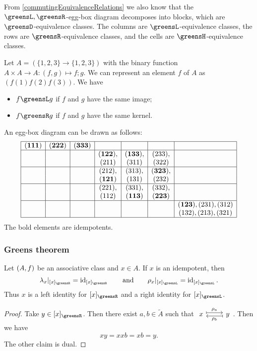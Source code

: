 From \ref{commutingEquivalenceRelations} we also know that the $\greensL,\greensR$-egg-box diagram decomposes into blocks, which are $\greensD$-equivalence classes. The columns are $\greensL$-equivalence classes, the rows are $\greensR$-equivalence classes, and the cells are $\greensH$-equivalence classes.

\begin{example}
Let $A = (\{1,2,3\} \to \{1,2,3\})$ with the binary function $A\times A \to A: (f,g)\mapsto f;g$. We can represent an element $f$ of $A$ as $(f(1) f(2) f(3))$. We have
\begin{itemize}
\item $f\greensL g$ if $f$ and $g$ have the same image;
\item $f\greensR g$ if $f$ and $g$ have the same kernel.
\end{itemize}
An egg-box diagram can be drawn as follows:
\[ \begin{array}{|c|c|c|c|c|c|c|}
\hline
\mathbf{(1 1 1)} & \mathbf{(2 2 2)} & \mathbf{(3 3 3)} &&& &  \\ \hline
&& & \mathbf{(1 2 2)}, & \mathbf{(1 3 3)}, & (2 3 3), &  \\
&& & (2 1 1)  & (3 1 1)  & (3 2 2)  &  \\ \hline
&& & (2 1 2), & (3 1 3), & \mathbf{(3 2 3)},  &  \\
&& & \mathbf{(1 2 1)}  & (1 3 1)  & (2 3 2)  &  \\ \hline
&& & (2 2 1), & (3 3 1), & (3 3 2),  &  \\
&& & (1 1 2)  & \mathbf{(1 1 3)}  & \mathbf{(2 2 3)}  &  \\ \hline
&& &&& & \mathbf{(1 2 3)}, (2 3 1), (3 1 2)  \\
&& &&& & (1 3 2), (2 1 3), (3 2 1)  \\ \hline
\end{array} \]
The bold elements are idempotents.
\end{example}

\subsubsection{Greens theorem}

\begin{lemma}
Let $\left( A, f \right)$ be an associative class and $x\in A$. If $x$ is an idempotent, then
\[ \lambda_x|_{[x]_\greensR} = \id_{[x]_\greensR} \qquad \text{and} \qquad \rho_x|_{[x]_\greensL} = \id_{[x]_\greensL}. \]
Thus $x$ is a left identity for $[x]_\greensR$ and a right identity for $[x]_\greensL$.
\end{lemma}
\begin{proof}
Take $y\in [x]_\greensR$. Then there exist $a,b\in \widetilde{A}$ such that $\begin{tikzcd}
x \ar[r, maps to, shift left, "\rho_a"] & y \ar[l, maps to, shift left, "\rho_b"]
\end{tikzcd}$. Then we have
\[ xy = xxb = xb = y. \]
The other claim is dual.
\end{proof}

